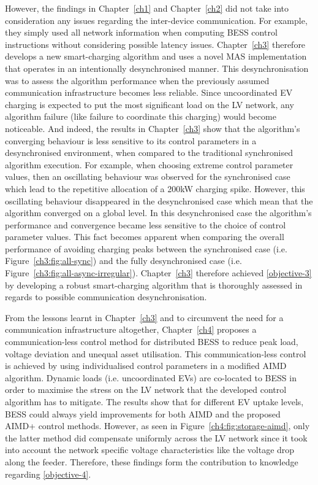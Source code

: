 However, the findings in Chapter~\ref{ch1} and Chapter~\ref{ch2} did not take into consideration any issues regarding the inter-device communication.
For example, they simply used all network information when computing BESS control instructions without considering possible latency issues.
Chapter~\ref{ch3} therefore develops a new smart-charging algorithm and uses a novel MAS implementation that operates in an intentionally desynchronised manner.
This desynchronisation was to assess the algorithm performance when the previously assumed communication infrastructure becomes less reliable.
Since uncoordinated EV charging is expected to put the most significant load on the LV network, any algorithm failure (like failure to coordinate this charging) would become noticeable.
And indeed, the results in Chapter~\ref{ch3} show that the algorithm's converging behaviour is less sensitive to its control parameters in a desynchronised environment, when compared to the traditional synchronised algorithm execution.
For example, when choosing extreme control parameter values, then an oscillating behaviour was observed for the synchronised case which lead to the repetitive allocation of a 200kW charging spike.
However, this oscillating behaviour disappeared in the desynchronised case which mean that the algorithm converged on a global level.
In this desynchronised case the algorithm's performance and convergence became less sensitive to the choice of control parameter values.
This fact becomes apparent when comparing the overall performance of avoiding charging peaks between the synchronised case (i.e. Figure~\ref{ch3:fig:all-sync}) and the fully desynchronised case (i.e. Figure~\ref{ch3:fig:all-async-irregular}).
Chapter~\ref{ch3} therefore achieved \ref{objective-3} by developing a robust smart-charging algorithm that is thoroughly assessed in regards to possible communication desynchronisation.

From the lessons learnt in Chapter~\ref{ch3} and to circumvent the need for a communication infrastructure altogether, Chapter~\ref{ch4} proposes a communication-less control method for distributed BESS to reduce peak load, voltage deviation and unequal asset utilisation.
This communication-less control is achieved by using individualised control parameters in a modified AIMD algorithm.
Dynamic loads (i.e. uncoordinated EVs) are co-located to BESS in order to maximise the stress on the LV network that the developed control algorithm has to mitigate.
The results show that for different EV uptake levels, BESS could always yield improvements for both AIMD and the proposed AIMD+ control methods.
However, as seen in Figure~\ref{ch4:fig:storage-aimd}, only the latter method did compensate uniformly across the LV network since it took into account the network specific voltage characteristics like the voltage drop along the feeder.
Therefore, these findings form the contribution to knowledge regarding \ref{objective-4}.

